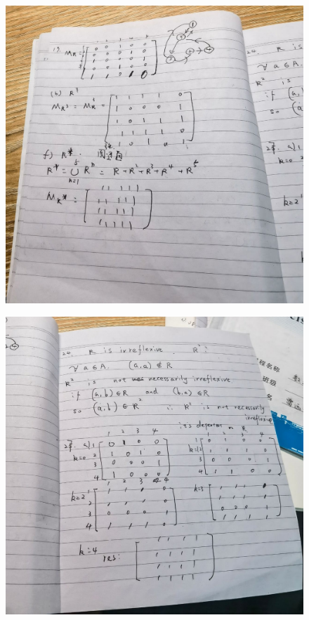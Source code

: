 \documentclass{article}
\begin{document}
    \begin{figure}[H]
    \centering
    \includegraphics[width=1\textwidth]{hw9/IMG_20221205_183710.jpg}
    \caption{\label{Lab9}}
    \end{figure}
    
    \begin{figure}[H]
    \centering
    \includegraphics[width=1\textwidth]{hw9/IMG_20221205_183712.jpg}
    \caption{\label{Lab9}}
    \end{figure}
        
\end{document}
